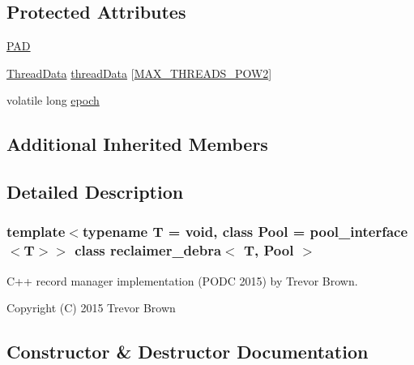 \subsection*{Protected Attributes}
\begin{DoxyCompactItemize}
\item 
\hyperlink{classreclaimer__debra_aabc191ce8b7b216157e1ab39f17f8471}{P\+AD}
\item 
\hyperlink{classreclaimer__debra_1_1ThreadData}{Thread\+Data} \hyperlink{classreclaimer__debra_a39e06df091da9fc001bf6a0d90ef070c}{thread\+Data} \mbox{[}\hyperlink{plaf_8h_ac1585a3455dd3e33e877e588be9e466b}{M\+A\+X\+\_\+\+T\+H\+R\+E\+A\+D\+S\+\_\+\+P\+O\+W2}\mbox{]}
\item 
volatile long \hyperlink{classreclaimer__debra_a5d09e238ce1873d0a812fc65c2fe46aa}{epoch}
\end{DoxyCompactItemize}
\subsection*{Additional Inherited Members}


\subsection{Detailed Description}
\subsubsection*{template$<$typename T = void, class Pool = pool\+\_\+interface$<$\+T$>$$>$\newline
class reclaimer\+\_\+debra$<$ T, Pool $>$}

C++ record manager implementation (P\+O\+DC 2015) by Trevor Brown.

Copyright (C) 2015 Trevor Brown 

\subsection{Constructor \& Destructor Documentation}
\mbox{\label{classreclaimer__debra_ac779977388bdb370d043086df041082c}} 
